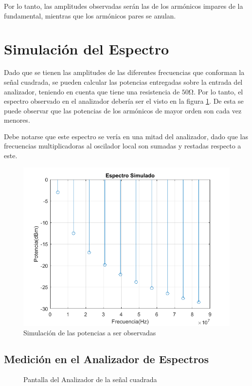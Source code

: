     Por lo tanto, las amplitudes observadas serán las de los armónicos
    impares de la fundamental, mientras que los armónicos pares se anulan.
    
    \section{Simulación del Espectro}
    Dado que se tienen las amplitudes de las diferentes frecuencias que
    conforman la señal cuadrada, se pueden calcular las potencias entregadas
    sobre la entrada del analizador, teniendo en cuenta que tiene una
    resistencia de $50\si{\ohm}$.
    Por lo tanto, el espectro observado en el analizador debería ser el visto en la figura
    \ref{fig:2,1,2}. De esta se puede observar que las potencias de los
    armónicos de mayor orden son cada vez menores.

    Debe notarse que este espectro se vería en una mitad del analizador,
    dado que las frecuencias multiplicadoras al oscilador local son sumadas
    y restadas respecto a este.

    \begin{figure}[ht]
        \begin{center}
            \includegraphics[width=0.75\linewidth]{contenido/img/spect_sqr.png}
            \caption{Simulación de las potencias a ser observadas}
            \label{fig:2,1,2}
        \end{center}
    \end{figure}

    \subsection{Medición en el Analizador de Espectros}

    \begin{figure}[ht]
        \begin{center}
            \caption{Pantalla del Analizador de la señal cuadrada}
            \label{fig:ansr,sqr}
        \end{center}
    \end{figure}

